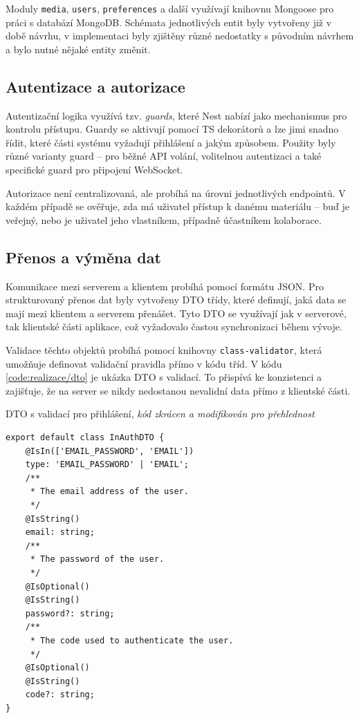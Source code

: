 Moduly \texttt{media}, \texttt{users}, \texttt{preferences} a další využívají knihovnu Mongoose pro práci s databází MongoDB. 
Schémata jednotlivých entit byly vytvořeny již v době návrhu, v implementaci byly zjištěny různé nedostatky s původním návrhem a bylo nutné nějaké entity změnit.

\subsection{Autentizace a autorizace}

Autentizační logika využívá tzv. \emph{guards}, které Nest nabízí jako mechanismus pro kontrolu přístupu.
Guardy se aktivují pomocí TS dekorátorů a lze jimi snadno řídit, které části systému vyžadují přihlášení a jakým způsobem. 
Použity byly různé varianty guard -- pro běžné API volání, volitelnou autentizaci a také specifické guard pro připojení WebSocket.

Autorizace není centralizovaná, ale probíhá na úrovni jednotlivých endpointů. 
V každém případě se ověřuje, zda má uživatel přístup k danému materiálu -- buď je veřejný, nebo je uživatel jeho vlastníkem, případně účastníkem kolaborace.

\subsection{Přenos a výměna dat}

Komunikace mezi serverem a klientem probíhá pomocí formátu JSON.
Pro strukturovaný přenos dat byly vytvořeny DTO třídy, které definují, jaká data se mají mezi klientem a serverem přenášet. 
Tyto DTO se využívají jak v serverové, tak klientské části aplikace, což vyžadovalo častou synchronizaci během vývoje.

Validace těchto objektů probíhá pomocí knihovny \texttt{class-validator}, která umožňuje definovat validační pravidla přímo v kódu tříd.
V kódu \ref{code:realizace/dto} je ukázka DTO s validací.
To přispívá ke konzistenci a zajišťuje, že na server se nikdy nedostanou nevalidní data přímo z klientské části.


\begin{listing}[ht!]
\caption[DTO s validací pro přihlášení]{DTO s validací pro přihlášení, \textit{kód zkrácen a modifikován pro přehlednost}}\label{code:realizace/dto}
\begin{verbatim}
export default class InAuthDTO {
    @IsIn(['EMAIL_PASSWORD', 'EMAIL'])
    type: 'EMAIL_PASSWORD' | 'EMAIL';
    /**
     * The email address of the user.
     */
    @IsString()
    email: string;
    /**
     * The password of the user.
     */
    @IsOptional()
    @IsString()
    password?: string;
    /**
     * The code used to authenticate the user.
     */
    @IsOptional()
    @IsString()
    code?: string;
}
\end{verbatim}
\end{listing}


